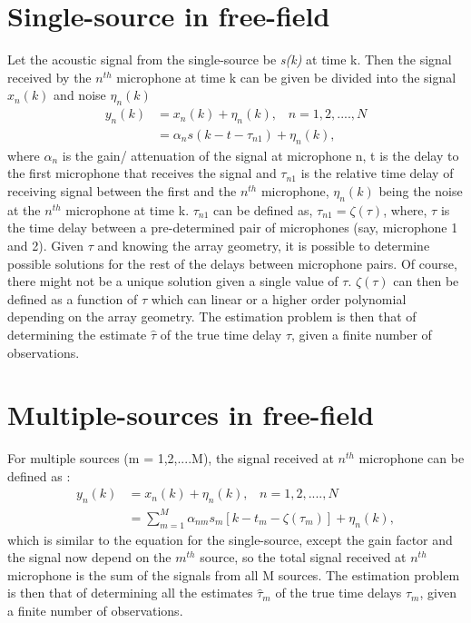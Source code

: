 \section{Single-source in free-field}
Let the acoustic signal from the single-source be \textit{s(k)} at time k. Then the signal received by the $n^{th}$ microphone at time k can be given be divided into the signal $x_n(k)$ and noise $\eta_n(k)$
\begin{equation}
    \begin{split}
    y_n(k) &= x_n(k) + \eta_n(k),\hspace{10pt} n = 1,2,....,N\\ 
           &=\alpha_n s(k-t-\tau_{n1}) + \eta_n(k),
    \end{split}
\end{equation}
where $\alpha_n$ is the gain/ attenuation of the signal at microphone n, t is the delay to the first microphone that receives the signal and $\tau_{n1}$ is the relative time delay of receiving signal between the first and the $n^{th}$ microphone, $\eta_n(k)$ being the noise at the $n^{th}$ microphone at time k. $\tau_{n1}$ can be defined as, $\tau_{n1}=\zeta(\tau)$, where, $\tau$ is the time delay between a pre-determined pair of microphones (say, microphone 1 and 2). Given $\tau$ and knowing the array geometry, it is possible to determine possible solutions for the rest of the delays between microphone pairs. Of course, there might not be a unique solution given a single value of $\tau$. $\zeta(\tau)$ can then be defined as a function of $\tau$ which can linear or a higher order polynomial depending on the array geometry. The estimation problem is then that of determining the estimate $\hat{\tau}$ of the true time delay $\tau$, given a finite number of observations.

\section{Multiple-sources in free-field}

For multiple sources (m = 1,2,....M), the signal received at $n^{th}$ microphone can be defined as : 
\begin{equation}
    \begin{split}
         y_n(k) &= x_n(k) + \eta_n(k),\hspace{10pt} n = 1,2,....,N \\
                &= \sum\limits_{m=1}^M \alpha_{nm}s_m[k - t_m - \zeta({\tau_m})] + \eta_n(k),
    \end{split}
\end{equation}
which is similar to the equation for the single-source, except the gain factor and the signal now depend on the $m^{th}$ source, so the total signal received at $n^{th}$ microphone is the sum of the signals from all M sources. The estimation problem is then that of determining all the estimates $\hat{\tau}_m$ of the true time delays $\tau_m$, given a finite number of observations.

